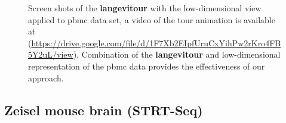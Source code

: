 \documentclass[
  12pt]{article}
\begin{document}
\begin{figure}
\begin{minipage}[t]{0.33\linewidth}
{{}

}

\subcaption{\label{fig-pbmc_sc2}}
\end{minipage}%
%
\begin{minipage}[t]{0.33\linewidth}

{\centering 


}

\subcaption{\label{fig-pbmc_sc3}}
\end{minipage}%

\caption{\label{fig-pbmc_sc}Screen shots of the \textbf{langevitour}
with the low-dimensional view applied to pbmc data set, a video of the
tour animation is available at
(\url{https://drive.google.com/file/d/1F7Xb2EIpfUruCxYihPw2rKro4FB5Y2uL/view}).
Combination of the \textbf{langevitour} and low-dimensional
representation of the pbmc data provides the effectiveness of our
approach.}

\end{figure}

\hypertarget{zeisel-mouse-brain-strt-seq}{%
\subsection{Zeisel mouse brain
(STRT-Seq)}\label{zeisel-mouse-brain-strt-seq}}
\end{document}
